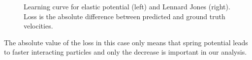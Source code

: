 \documentclass[../../master_thesis_np.tex]{subfiles}
\begin{document}
\begin{figure}[b]
	\centering
	\caption{Learning curve for elastic potential (left) and Lennard Jones (right). Loss is the absolute difference between predicted and ground truth velocities.}
	\label{fig:learning_curve}
\end{figure}

The absolute value of the loss in this case only means that spring potential leads to faster interacting particles and only the decrease is important in our analysis.
\end{document}

